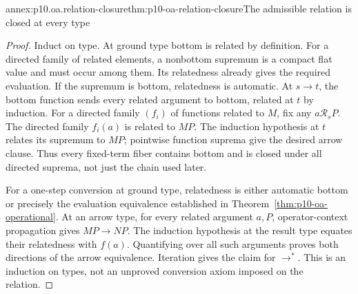 \begin{annexitem}{annex:p10.oa.relation-closure}{thm:p10-oa-relation-closure}{The admissible relation is closed at every type}
\begin{proof}
Induct on type. At ground type bottom is related by definition.
For a directed family of related elements, a nonbottom supremum is a
compact flat value and must occur among them. Its relatedness already
gives the required evaluation. If the supremum is bottom, relatedness
is automatic. At \(s\to t\), the bottom function sends every related
argument to bottom, related at \(t\) by induction. For a directed
family \((f_i)\) of functions related to \(M\), fix any
\(a\mathrel{\mathcal R_s}P\). The directed family \(f_i(a)\) is
related to \(M P\). The induction hypothesis at \(t\) relates its
supremum to \(M P\); pointwise function suprema give the desired
arrow clause. Thus every fixed-term fiber contains bottom and is closed
under all directed suprema, not just the chain used later.

For a one-step conversion at ground type, relatedness is either automatic
bottom or precisely the evaluation equivalence established in
Theorem~\ref{thm:p10-oa-operational}. At an arrow type, for every
related argument \(a,P\), operator-context propagation gives
\(M P\to N P\). The induction hypothesis at the result type equates
their relatedness with \(f(a)\). Quantifying over all such arguments
proves both directions of the arrow equivalence. Iteration gives the
claim for \(\to^*\). This is an induction on types, not an unproved
conversion axiom imposed on the relation.
\end{proof}
\end{annexitem}

